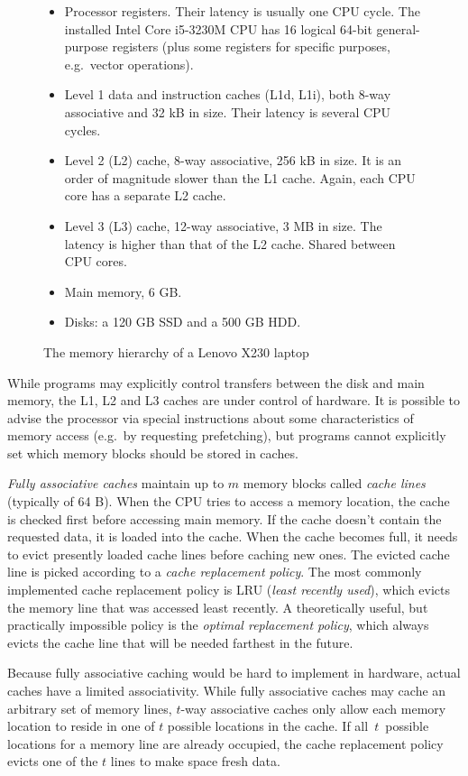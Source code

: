 \begin{figure}
\begin{itemize}
\item Processor registers. Their latency is usually one CPU cycle.
	The installed Intel Core i5-3230M CPU has 16 logical 64-bit
	general-purpose registers (plus some registers for specific purposes,
	e.g.\ vector operations).
\item Level 1 data and instruction caches (L1d, L1i), both 8-way associative
	and 32 kB in size. Their latency is several CPU cycles.
\item Level 2 (L2) cache, 8-way associative, 256 kB in size.
	It is an order of magnitude slower than the L1 cache. Again, each
	CPU core has a separate L2 cache.
\item Level 3 (L3) cache, 12-way associative, 3 MB in size.
	The latency is higher than that of the L2 cache. Shared between CPU
	cores.
\item Main memory, 6 GB.
\item Disks: a 120 GB SSD and a 500 GB HDD.
\end{itemize}
\caption{The memory hierarchy of a Lenovo X230 laptop}
\end{figure}

While programs may explicitly control transfers between the disk and main
memory, the L1, L2 and L3 caches are under control of hardware.
It is possible to advise the processor via special instructions about some
characteristics of memory access (e.g.\ by requesting prefetching), but programs
cannot explicitly set which memory blocks should be stored in caches.

\emph{Fully associative caches} maintain up to $m$ memory blocks called
\textit{cache lines} (typically of 64 B). When the CPU tries to access
a memory location, the cache is checked first before accessing main memory.
If the cache doesn't contain the requested data, it is loaded into the cache.
When the cache becomes full, it needs to evict presently loaded cache lines
before caching new ones. The evicted cache line is picked according
to a \emph{cache replacement policy}. The most commonly implemented cache
replacement policy is LRU (\emph{least recently used}), which evicts
the memory line that was accessed least recently.
A theoretically useful, but practically impossible policy is the \emph{optimal
replacement policy}, which always evicts the cache line that will be needed
farthest in the future.

Because fully associative caching would be hard to implement in hardware,
actual caches have a limited associativity. While fully associative
caches may cache an arbitrary set of memory lines, $t$-way associative
caches only allow each memory location to reside in one of $t$ possible
locations in the cache. If all~$t$~possible locations for a memory line
are already occupied, the cache replacement policy evicts one of the $t$
lines to make space fresh data.


